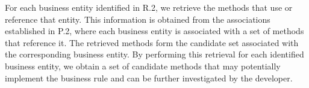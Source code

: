 \vspace{-0.1em}

For each business entity identified in R.2, we retrieve the methods that use or reference that entity. This information is obtained from the associations established in P.2, where each business entity is associated with a set of methods that reference it. The retrieved methods form the candidate set associated with the corresponding business entity. By performing this retrieval for each identified business entity, we obtain a set of candidate methods that may potentially implement the business rule and can be further investigated by the developer.